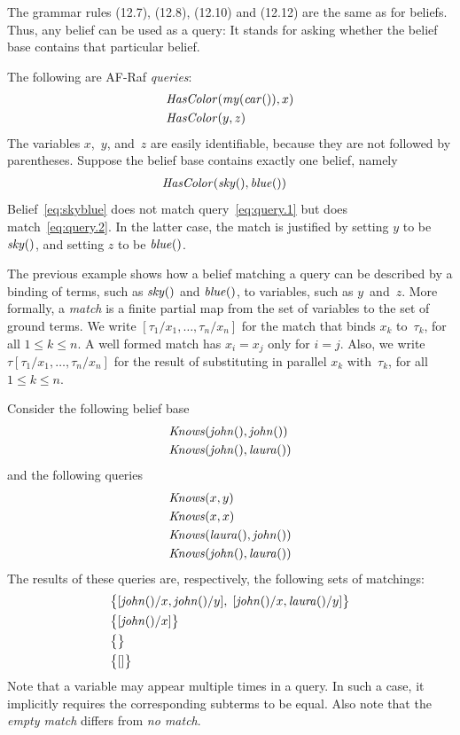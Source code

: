\documentclass[a4paper,12pt,oneside,fleqn]{book} %
\begin{document}
The grammar rules (12.7), (12.8), (12.10) and (12.12) are the same as for
beliefs.  Thus, any belief can be used as a query:  It stands for asking
whether the belief base contains that particular belief.

\begin{example} The following are AF-Raf \emph{queries}: \begin{align}
&{\it HasColor}({\it my}({\it car}()), x) \label{eq:query.1} \\ &{\it
HasColor}(y, z) \label{eq:query.2} \end{align} The variables $x$,~$y$,
and~$z$ are easily identifiable, because they are not followed by
parentheses.  Suppose the belief base contains exactly one belief, namely
\begin{align} &{\it HasColor}({\it sky}(), {\it blue}()) \label{eq:skyblue}
\end{align} Belief~\eqref{eq:skyblue} does not match
query~\eqref{eq:query.1} but does match~\eqref{eq:query.2}.  In the latter
case, the match is justified by setting $y$ to be ${\it sky}()$, and
setting $z$ to be ${\it blue}()$.
\end{example}

The previous example shows how a belief matching a query can be described
by a binding of terms, such as ${\it sky}()$ and ${\it blue}()$, to
variables, such as $y$~and~$z$.  More formally, a \emph{match} is a finite
partial map from the set of variables to the set of ground terms.  We write
$[\tau_1/x_1,\ldots,\tau_n/x_n]$ for the match that binds $x_k$
to~$\tau_k$, for all $1\le k\le n$. A well formed match has $x_i=x_j$ only
for $i=j$.  Also, we write $\tau[\tau_1/x_1,\ldots,\tau_n/x_n]$ for the
result of substituting in parallel $x_k$ with~$\tau_k$, for all $1\le k\le
n$.

\begin{example} Consider the following belief base \begin{align} &{\it
Knows}({\it john}(), {\it john}()) \\ &{\it Knows}({\it john}(), {\it
laura}()) \end{align} and the following queries \begin{align} &{\it
Knows}(x, y) \\ &{\it Knows}(x, x) \\ &{\it Knows}({\it laura}(), {\it
john}()) \\ &{\it Knows}({\it john}(), {\it laura}()) \end{align} The
results of these queries are, respectively, the following sets of
matchings: \begin{align} &\bigl\{ [{\it john}()/x, {\it john}()/y],\; [{\it
john}()/x,{\it laura}()/y] \bigr\} \\ &\bigl\{ [{\it john}()/x] \bigr\} \\
&\bigl\{\bigr\} \\ &\bigl\{[]\bigr\} \end{align} Note that a variable may
appear multiple times in a query.  In such a case, it implicitly requires
the corresponding subterms to be equal.  Also note that the \emph{empty
match} differs from \emph{no match}.
\end{example}
\end{document}
